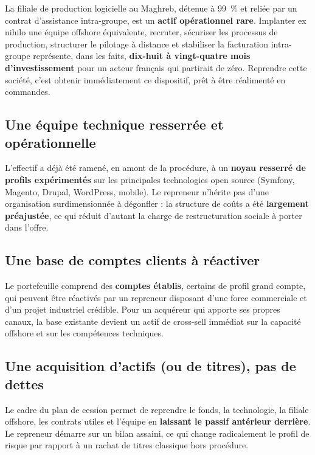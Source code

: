 \documentclass[11pt,a4paper]{article}
\begin{document}
La filiale de production logicielle au Maghreb, détenue à 99~\% et reliée par un contrat d'assistance intra-groupe, est un \textbf{actif opérationnel rare}. Implanter ex nihilo une équipe offshore équivalente, recruter, sécuriser les processus de production, structurer le pilotage à distance et stabiliser la facturation intra-groupe représente, dans les faits, \textbf{dix-huit à vingt-quatre mois d'investissement} pour un acteur français qui partirait de zéro. Reprendre cette société, c'est obtenir immédiatement ce dispositif, prêt à être réalimenté en commandes.

\subsection{Une équipe technique resserrée et opérationnelle}

L'effectif a déjà été ramené, en amont de la procédure, à un \textbf{noyau resserré de profils expérimentés} sur les principales technologies open source (Symfony, Magento, Drupal, WordPress, mobile). Le repreneur n'hérite pas d'une organisation surdimensionnée à dégonfler : la structure de coûts a été \textbf{largement préajustée}, ce qui réduit d'autant la charge de restructuration sociale à porter dans l'offre.

\subsection{Une base de comptes clients à réactiver}

Le portefeuille comprend des \textbf{comptes établis}, certains de profil grand compte, qui peuvent être réactivés par un repreneur disposant d'une force commerciale et d'un projet industriel crédible. Pour un acquéreur qui apporte ses propres canaux, la base existante devient un actif de cross-sell immédiat sur la capacité offshore et sur les compétences techniques.

\subsection{Une acquisition d'actifs (ou de titres), pas de dettes}

Le cadre du plan de cession permet de reprendre le fonds, la technologie, la filiale offshore, les contrats utiles et l'équipe en \textbf{laissant le passif antérieur derrière}. Le repreneur démarre sur un bilan assaini, ce qui change radicalement le profil de risque par rapport à un rachat de titres classique hors procédure.
\end{document}
